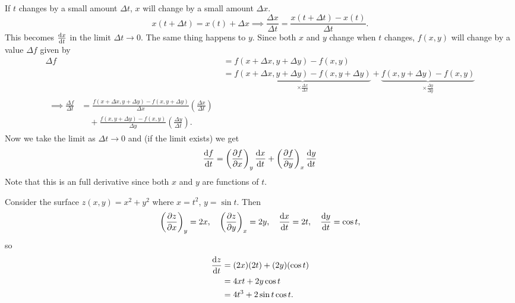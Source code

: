 \documentclass[../multivariate_calculus.tex]{subfiles}
\begin{document}
        \paragraph{}
        If $t$ changes by a small amount $\Delta t$, $x$ will change by a small amount $\Delta x$.
        \begin{equation}
            x(t+\Delta t)=x(t)+\Delta x\implies\frac{\Delta x}{\Delta t}=\frac{x(t+\Delta t)-x(t)}{\Delta t}.
        \end{equation}
        This becomes $\dv{x}{t}$ in the limit $\Delta t\to0$.
        The same thing happens to $y$.
        Since both $x$ and $y$ change when $t$ changes, $f(x,y)$ will change by a value $\Delta f$ given by
        \begin{align}
            \Delta f&=f(x+\Delta x,y+\Delta y)-f(x,y)\\
            &=\underbrace{f(x+\Delta x,y+\Delta y)-{f(x,y+\Delta y)}}_{\times\frac{\Delta x}{\Delta x}}+\underbrace{f(x,y+\Delta y)-f(x,y)}_{\times\frac{\Delta y}{\Delta y}}\\
            \begin{split}
                \implies\frac{\Delta f}{\Delta t}&=\frac{f(x+\Delta x,y+\Delta y)-f(x,y+\Delta y)}{\Delta x}\left(\frac{\Delta x}{\Delta t}\right)\\
                &\quad+\frac{f(x,y+\Delta y)-f(x,y)}{\Delta y}\left(\frac{\Delta y}{\Delta t}\right).
            \end{split}
        \end{align}
        Now we take the limit as $\Delta t\to0$ and (if the limit exists) we get
        \begin{equation}
            \dv{f}{t}=\left(\pdv{f}{x}\right)_y\dv{x}{t}+\left(\pdv{f}{y}\right)_x\dv{y}{t}
        \end{equation}
        Note that this is an full derivative since both $x$ and $y$ are functions of $t$.
        \begin{example}
            Consider the surface $z(x,y)=x^2+y^2$ where $x=t^2$, $y=\sin t$.
            Then
            \begin{equation}
                \left(\pdv{z}{x}\right)_y=2x,\quad\left(\pdv{z}{y}\right)_x=2y,\quad\dv{x}{t}=2t,\quad\dv{y}{t}=\cos t,
            \end{equation}
            so
            \begin{align}
                \dv{z}{t}&=(2x)(2t)+(2y)(\cos t)\\
                &=4xt+2y\cos t\\
                &=4t^3+2\sin t\cos t.
            \end{align}
        \end{example}
\end{document}
